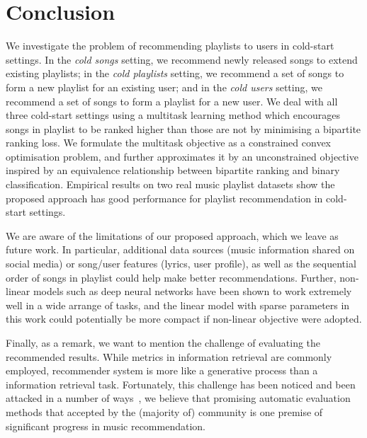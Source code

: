 \section{Conclusion}

We investigate the problem of recommending playlists to users in cold-start settings.
In the {\it cold songs} setting, we recommend newly released songs to extend existing playlists;
in the {\it cold playlists} setting, we recommend a set of songs to form a new playlist for an existing user;
and in the {\it cold users} setting, we recommend a set of songs to form a playlist for a new user.
We deal with all three cold-start settings using a multitask learning method which encourages songs in playlist 
to be ranked higher than those are not by minimising a bipartite ranking loss. 
We formulate the multitask objective as a constrained convex optimisation problem, and further approximates it 
by an unconstrained objective inspired by an equivalence relationship between bipartite ranking and binary classification. 
Empirical results on two real music playlist datasets show the proposed approach 
has good performance for playlist recommendation in cold-start settings.

We are aware of the limitations of our proposed approach, which we leave as future work.
In particular, additional data sources (\eg music information shared on social media) or song/user 
features (\eg lyrics, user profile), as well as the sequential order of songs in playlist %
could help make better recommendations.
Further, non-linear models such as deep neural networks have been shown to work extremely well in a wide arrange of tasks,
and the linear model with sparse parameters in this work could potentially be more compact if non-linear objective were adopted.

Finally, as a remark, we want to mention the challenge of evaluating the recommended results.
While metrics in information retrieval are commonly employed, recommender system is more like a generative process
than a information retrieval task. Fortunately, this challenge has been noticed and been attacked in a number of
ways~\cite{mcfee2011natural,mcfee2012hypergraph,schedl2017}, 
we believe that promising automatic evaluation methods that accepted by the (majority of) 
community is one premise of significant progress in music recommendation.
